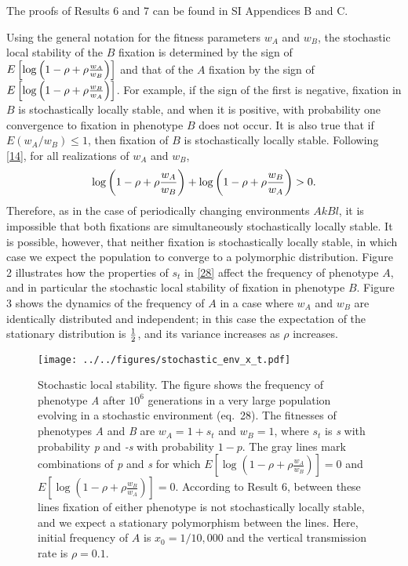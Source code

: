 \documentclass[9pt,twocolumn,twoside,lineno]{pnas-new}
\begin{document}
 The proofs of Results 6 and 7 can be found in SI Appendices B and C.
 
 
 Using the general notation for the fitness parameters $w_A$ and $w_B$, the stochastic local stability of the $B$ fixation is determined by the sign of $E\left[\log\left(1-\rho+\rho{w_A\over w_B}\right)\right]$ and that of the $A$ fixation by the sign of $E\left[\log\left(1-\rho+\rho{w_B\over w_A}\right)\right]$. For example, if the  sign of the first  is negative, fixation in $B$ is stochastically locally stable, and when it is positive, with probability one convergence to fixation in phenotype $B$ does not occur. It is also true  that if $E(w_A/w_B)\le 1$, then fixation of $B$ is stochastically locally stable. Following \eqref{14}, for all realizations of $w_A$ and $w_B$,
 \begin{equation}
 \log\left(1-\rho +\rho{w_A\over w_B}\right) +\log\left(1-\rho +\rho{w_B\over w_A}\right)>0.\label{30}\end{equation}
 Therefore, as in the case of periodically changing environments $AkBl$, it is impossible that both fixations are simultaneously stochastically locally stable.  It is possible, however, that neither fixation is  stochastically locally stable, in which case we expect the population to converge to a polymorphic distribution. Figure 2 illustrates how the properties of $s_t$ in \eqref{28} affect the frequency of phenotype $A$, and in particular the stochastic local stability of fixation in phenotype $B$. Figure 3 shows the dynamics of the frequency of $A$ in a case where $w_A$ and $w_B$ are identically distributed and independent; in this case the expectation of the stationary distribution is ${1\over 2}$, and its variance increases as $\rho$ increases.

\begin{figure}[h]
\centering
\texttt{[image: ../../figures/stochastic\_env\_x\_t.pdf]}
\caption{Stochastic local stability. 
The figure shows the frequency of phenotype \emph{A} after \(10^6\) generations in a very large population evolving in a stochastic environment (eq.\ 28).
The fitnesses of phenotypes \emph{A} and \emph{B} are \(w_A=1+s_t\) and \(w_B=1\),
where \(s_t\) is \emph{s} with probability \emph{p} and \emph{-s} with probability \(1-p\).
The gray lines mark combinations of \emph{p} and \emph{s} for which \(E[\log{(1-\rho+\rho\frac{w_A}{w_B})}]=0\) and \(E[\log{(1-\rho+\rho\frac{w_B}{w_A})}]=0\).
According to Result 6, between these lines fixation of either phenotype is not stochastically locally stable, and we expect a stationary polymorphism between the lines.
Here, initial frequency of \(A\) is \(x_0=1/10,000\) and the vertical transmission rate is \(\rho=0.1\).}\label{fig:stochastic_env_x_t}
\end{figure} 
\end{document}
